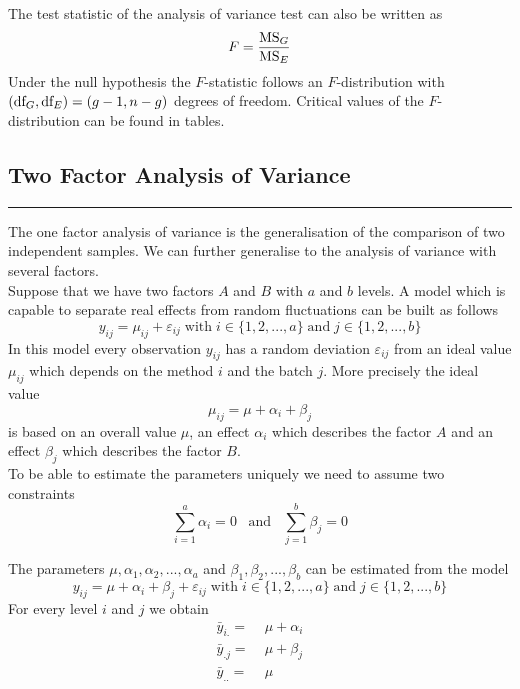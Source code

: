 The test statistic of the analysis of variance test can also be written as
\begin{equation}
  F = \frac{\textup{MS}_G}{\textup{MS}_E}
\end{equation}
Under the null hypothesis the $F$-statistic follows an $F$-distribution with $(\textup{df}_G, \textup{df}_E) = (g - 1, n - g)$ degrees of freedom. Critical values of the $F$-distribution can be found in tables.

\subsection{Two Factor Analysis of Variance}
\noindent\rule[\linienAbstand]{\linewidth}{\linienDicke}
The one factor analysis of variance is the generalisation of the comparison of two independent samples. We can further generalise to the analysis of variance with several factors.\\
Suppose that we have two factors $A$ and $B$ with $a$ and $b$ levels. A model which is capable to separate real effects from random fluctuations can be built as follows
\begin{equation}
  y_{ij} = \mu_{ij} + \varepsilon_{ij} \;\text{with}\; i \in \{1, 2, ..., a\} \;\text{and}\; j \in \{1, 2, ...,b\}
\end{equation}
In this model every observation $y_{ij}$ has a random deviation $\varepsilon_{ij}$ from an ideal value $\mu_{ij}$ which depends on the method $i$ and the batch $j$. More precisely the ideal value
\begin{equation}
  \mu_{ij} = \mu + \alpha_i + \beta_j
\end{equation}
is based on an overall value $\mu$, an effect $\alpha_i$ which describes the factor $A$ and an effect $\beta_j$ which describes the factor $B$.\\
To be able to estimate the parameters uniquely we need to assume two constraints
\begin{equation}
  \sum_{i=1}^{a} \alpha_i = 0 \;\;\; \text{and} \;\;\; \sum_{j=1}^b \beta_j = 0
\end{equation}

The parameters $\mu, \alpha_1, \alpha_2, . . . , \alpha_a$ and $\beta_1, \beta_2, . . . , \beta_b$ can be estimated from the model
\begin{equation}
  y_{ij} = \mu + \alpha_i + \beta_j + \varepsilon_{ij} \;\text{with}\; i \in \{1, 2, ..., a\} \;\text{and}\; j \in \{1, 2, ...,b\}
\end{equation}
For every level $i$ and $j$ we obtain
\begin{equation}
  \begin{split}
    \bar{y}_{i.} =& \; \mu + \alpha_i\\
    \bar{y}_{.j} =& \; \mu + \beta_j\\
    \bar{y}_{..} =& \; \mu
      \end{split}
\end{equation}

